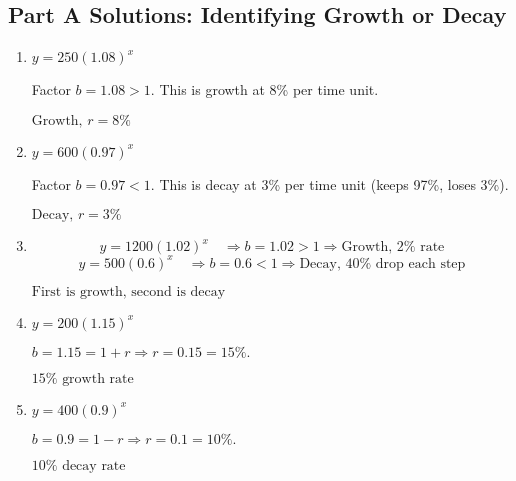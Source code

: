 \documentclass[12pt]{article}
\begin{document}
\subsection*{Part A Solutions: Identifying Growth or Decay}
\begin{enumerate}
  \item \(y = 250(1.08)^x\)

  Factor \(b = 1.08 > 1\). This is growth at 8\% per time unit.

  \(\boxed{\text{Growth, } r = 8\%}\)

  \item \(y = 600(0.97)^x\)

  Factor \(b = 0.97 < 1\). This is decay at 3\% per time unit (keeps 97\%, loses 3\%).

  \(\boxed{\text{Decay, } r = 3\%}\)

  \item
  \[
  y = 1200(1.02)^x \quad \Rightarrow b = 1.02 > 1 \Rightarrow \text{Growth, } 2\% \text{ rate}
  \]
  \[
  y = 500(0.6)^x \quad \Rightarrow b = 0.6 < 1 \Rightarrow \text{Decay, } 40\% \text{ drop each step}
  \]

  \(\boxed{\text{First is growth, second is decay}}\)

  \item \(y = 200(1.15)^x\)

  \(b = 1.15 = 1 + r \Rightarrow r = 0.15 = 15\%.\)

  \(\boxed{15\% \text{ growth rate}}\)

  \item \(y = 400(0.9)^x\)

  \(b = 0.9 = 1 - r \Rightarrow r = 0.1 = 10\%.\)

  \(\boxed{10\% \text{ decay rate}}\)
\end{enumerate}
\end{document}
